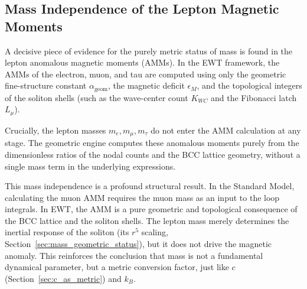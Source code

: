 \documentclass[10pt,a4paper]{article}
\begin{document}
\vspace{1em}
\noindent
\begin{center}
\end{center}
\vspace{1em}

\subsection{Mass Independence of the Lepton Magnetic Moments}
\label{sec:amm_mass_independence}

A decisive piece of evidence for the purely metric status of mass is found in the lepton anomalous magnetic moments (AMMs). In the EWT framework, the AMMs of the electron, muon, and tau are computed using only the geometric fine-structure constant \(\alpha_{\text{geom}}\), the magnetic deficit \(\epsilon_M\), and the topological integers of the soliton shells (such as the wave-center count \(K_{WC}\) and the Fibonacci latch \(L_\mu\)).

Crucially, the lepton masses \(m_e, m_\mu, m_\tau\) do not enter the AMM calculation at any stage. The geometric engine computes these anomalous moments purely from the dimensionless ratios of the nodal counts and the BCC lattice geometry, without a single mass term in the underlying expressions.

This mass independence is a profound structural result. In the Standard Model, calculating the muon AMM requires the muon mass as an input to the loop integrals. In EWT, the AMM is a pure geometric and topological consequence of the BCC lattice and the soliton shells. The lepton mass merely determines the inertial response of the soliton (its \(r^5\) scaling, Section~\ref{sec:mass_geometric_status}), but it does not drive the magnetic anomaly. This reinforces the conclusion that mass is not a fundamental dynamical parameter, but a metric conversion factor, just like \(c\) (Section~\ref{sec:c_as_metric}) and \(k_B\).
\end{document}
